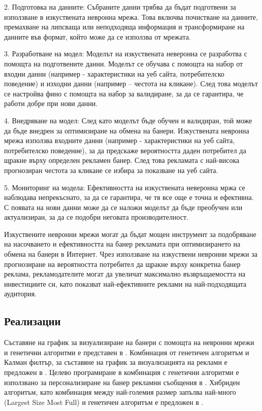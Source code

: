 2. Подготовка на данните: Събраните данни трябва да бъдат подготвени за използване в изкуствената невронна мрежа. Това включва почистване на данните, премахване на липсваща или неподходяща информация и трансформиране на данните във формат, който може да се използва от мрежата.

3. Разработване на модел: Моделът на изкуствената неверонна се разработва с помощта на подготвените данни. Моделът се обучава с помощта на набор от входни данни (например - характеристики на уеб сайта, потребителско поведение) и изходни данни (например – честота на кликане). След това моделът се настройва фино с помощта на набор за валидиране, за да се гарантира, че работи добре при нови данни.

4. Внедряване на модел: След като моделът бъде обучен и валидиран, той може да бъде внедрен за оптимизиране на обмена на банери. Изкуствената невронна мрежа използва входните данни (например - характеристики на уеб сайта, потребителско поведение), за да предскаже вероятността даден потребител да щракне върху определен рекламен банер. След това рекламата с най-висока прогнозиран честота за кликане се избира за показване на уеб сайта.

5. Мониторинг на модела: Ефективността на изкуствената неверонна мржа се наблюдава непрекъснато, за да се гарантира, че тя все още е точна и ефективна. С появата на нови данни може да се наложи моделът да бъде преобучен или актуализиран, за да се подобри неговата производителност.

Изкуствените невронни мрежи могат да бъдат мощен инструмент за подобряване на насочването и ефективността на банер рекламата при оптимизирането на обмена на банери в Интернет. Чрез използване на изкуствени невронни мрежи за прогнозиране на вероятността потребител да щракне върху конкретна банер реклама, рекламодателите могат да увеличат максимално възвръщаемостта на инвестициите си, като показват най-ефективните реклами на най-подходящата аудитория.

\subsection{Реализации}

Съставяне на график за визуализиране на банери с помощта на невронни мрежи и генетични алгоритми е представен в \cite{DEANE20125168}. Комбинация от генетичен алгоритъм и Калман филтър, за съставяне на график за визуализацията на реклами е предложен в \cite{doi:10.1287/mksc.17.3.214}. Целево програмиране в комбинация с генетични алгоритми е използвано за персонализиране на банер рекламни съобщения в \cite{KARUGA200185}. Хибриден алгоритъм, като комбинация между най-големия размер запълва най-много (Largest Size Most Full) и генетичен алгоритъм е предложен в \cite{KUMAR20061067}.

